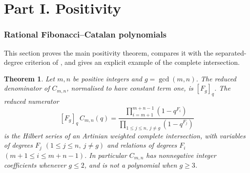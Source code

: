 \documentclass[11pt,a4paper]{article}
\newtheorem{theorem}{Theorem}[section]
\theoremstyle{definition}\newtheorem{definition}[theorem]{Definition}
\theoremstyle{remark}\newtheorem{remark}[theorem]{Remark}\newtheorem{example}[theorem]{Example}
\numberwithin{equation}{section}
\begin{document}
\part*{Part I. Positivity}
\section{Rational Fibonacci--Catalan polynomials}\label{sec:typeA}
This section proves the main positivity theorem, compares it with the separated-degree criterion of \cite{gly}, and gives an explicit example of the complete intersection.

\begin{theorem}\label{thm:typeA}
Let $m,n$ be positive integers and $g=\gcd(m,n)$. The reduced denominator of $C_{m,n}$, normalised to have constant term one, is $[F_g]_q$. The reduced numerator
\begin{equation}\label{eq:corrected}
 [F_g]_q\,C_{m,n}(q)=\frac{\prod_{i=m+1}^{m+n-1}(1-q^{F_i})}{\prod_{1\le j\le n,\ j\ne g}(1-q^{F_j})}
\end{equation}
is the Hilbert series of an Artinian weighted complete intersection, with variables of degrees $F_j$ $(1\le j\le n,\ j\ne g)$ and relations of degrees $F_i$ $(m+1\le i\le m+n-1)$. In particular $C_{m,n}$ has nonnegative integer coefficients whenever $g\le2$, and is not a polynomial when $g\ge3$.
\end{theorem}
\end{document}
